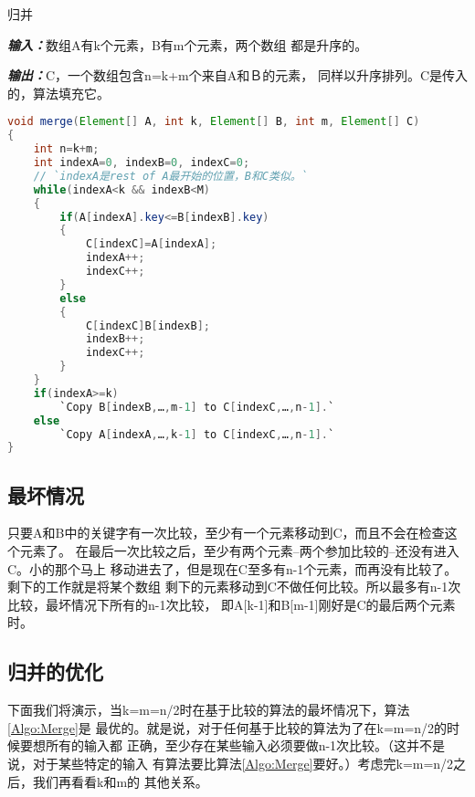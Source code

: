 \begin{algorithm}\label{Algo:Merge}
归并

{\textbf{\emph{输入：}}}数组A有k个元素，B有m个元素，两个数组
都是升序的。

{\textbf{\emph{输出：}}}C，一个数组包含n=k+m个来自A和Ｂ的元素，
同样以升序排列。C是传入的，算法填充它。
\end{algorithm}
\begin{lstlisting}[language={Java},keywordstyle=\color{blue!70}, commentstyle=\color{red!50!green!50!blue!50}]
void merge(Element[] A, int k, Element[] B, int m, Element[] C)
{
    int n=k+m;
    int indexA=0, indexB=0, indexC=0;
    // `indexA是rest of A最开始的位置，B和C类似。`
    while(indexA<k && indexB<M)
    {
        if(A[indexA].key<=B[indexB].key)
        {
            C[indexC]=A[indexA];
            indexA++;
            indexC++;
        }
        else
        {
            C[indexC]B[indexB];
            indexB++;
            indexC++;
        }
    }
    if(indexA>=k)
        `Copy B[indexB,…,m-1] to C[indexC,…,n-1].`
    else
        `Copy A[indexA,…,k-1] to C[indexC,…,n-1].`
}
\end{lstlisting}

\subsection{最坏情况}
只要A和B中的关键字有一次比较，至少有一个元素移动到C，而且不会在检查这个元素了。
在最后一次比较之后，至少有两个元素--两个参加比较的--还没有进入C。小的那个马上
移动进去了，但是现在C至多有n-1个元素，而再没有比较了。剩下的工作就是将某个数组
剩下的元素移动到C不做任何比较。所以最多有n-1次比较，最坏情况下所有的n-1次比较，
即A[k-1]和B[m-1]刚好是C的最后两个元素时。

\subsection{归并的优化}
下面我们将演示，当k=m=n/2时在基于比较的算法的最坏情况下，算法\ref{Algo:Merge}是
最优的。就是说，对于任何基于比较的算法为了在k=m=n/2的时候要想所有的输入都
正确，至少存在某些输入必须要做n-1次比较。（这并不是说，对于某些特定的输入
有算法要比算法\ref{Algo:Merge}要好。）考虑完k=m=n/2之后，我们再看看k和m的
其他关系。

